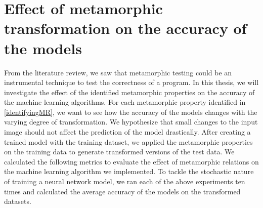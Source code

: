 \section{Effect of metamorphic transformation on the accuracy of the models}
From the literature review, we saw that metamorphic testing could be an instrumental technique to test the correctness of a program. In this thesis, we will investigate the effect of the identified metamorphic properties on the accuracy of the machine learning algorithms. For each metamorphic property identified in \ref{identifyingMR}, we want to see how the accuracy of the models changes with the varying degree of transformation. We hypothesize that small changes to the input image should not affect the prediction of the model drastically. After creating a trained model with the training dataset, we applied the metamorphic properties on the training data to generate transformed versions of the test data. We calculated the following metrics to evaluate the effect of metamorphic relations on the machine learning algorithm we implemented. To tackle the stochastic nature of training a neural network model, we ran each of the above experiments ten times and calculated the average accuracy of the models on the transformed datasets.


